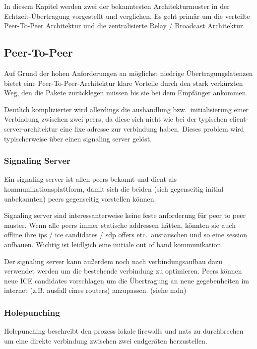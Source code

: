 \documentclass{IEEEtran}
\begin{document}
\begin{twocolumn}
In diesem Kapitel werden zwei der bekanntesten Architekturmuster in der
Echtzeit-Übertragung vorgestellt und verglichen. Es geht primär um die
verteilte Peer-To-Peer Architektur und die zentralisierte Relay / Broadcast
Architektur.

\subsection{Peer-To-Peer}

Auf Grund der hohen Anforderungen an möglichst niedrige Übertragungslatenzen
bietet eine Peer-To-Peer-Architektur klare Vorteile durch den stark verkürzten
Weg, den die Pakete zurücklegen müssen bis sie bei dem Empfänger ankommen.

Deutlich komplizierter wird allerdings die aushandlung bzw.\ initialisierung
einer Verbindung zwischen zwei peers, da diese sich nicht wie bei der typischen
client-server-architektur eine fixe adresse zur verbindung haben. Dieses
problem wird typischerweise über einen signaling server gelöst.

\subsubsection{Signaling Server}
Ein signaling server ist allen peers bekannt und dient als
kommunikationsplattform, damit sich die beiden (sich gegenseitig initial
unbekannten) peers gegenseitig vorstellen können.

Signaling server sind interessanterweise keine feste anforderung für peer to
peer muster. Wenn alle peers immer statische addressen hätten, könnten sie auch
offline ihre ips / ice candidates / sdp offers etc.\ austauschen und so eine
session aufbauen. Wichtig ist leidlgich eine initiale out of band
kommunikation.

Der signaling server kann außerdem noch nach verbindungsaufbau dazu verwendet
werden um die bestehende verbindung zu optimieren. Peers können neue ICE
candidates vorschlagen um die Übertragung an neue gegebenheiten im internet
(z.B. ausfall eines routers) anzupassen. (siehe mdn)


\subsubsection{Holepunching}
Holepunching beschreibt den prozess lokale firewalls und nats zu durchbrechen
um eine direkte verbindung zwischen zwei endgeräten herzustellen.


\end{twocolumn}
\end{document}
